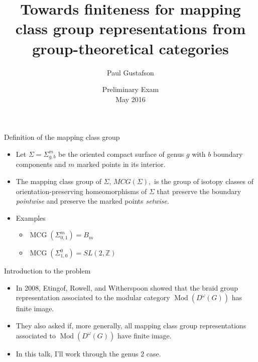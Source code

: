 \documentclass{beamer}
\title{Towards finiteness for mapping class group representations from group-theoretical categories}
\author{Paul Gustafson}%
\date{Preliminary Exam \\
May 2016}
\DeclareMathOperator{\MCG}{MCG}
\DeclareMathOperator{\Mod}{Mod}
\begin{document}
\begin{frame}
  \titlepage
\end{frame}



\begin{frame}{Definition of the mapping class group}
\begin{itemize}
\item
    Let $\Sigma = \Sigma_{g,b}^m$ be the oriented compact surface of genus $g$ with $b$ boundary components and $m$ marked points in its interior.

    \pause
\item
   The mapping class group of $\Sigma$, 
   $MCG(\Sigma),$
   is the group of isotopy classes of orientation-preserving homeomorphisms of $\Sigma$ that preserve the boundary \emph{pointwise} and preserve the marked points \emph{setwise}.
  
  \pause
  \item Examples
  \begin{itemize}
    \item $\MCG(\Sigma_{0,1}^m) = B_m$
    \item $\MCG(\Sigma_{1,0}^0) = SL(2,\mathbb Z)$
  \end{itemize}
\end{itemize}
\end{frame}

\begin{frame}{Introduction to the problem}

\begin{itemize}

\item In 2008, Etingof, Rowell, and Witherspoon \cite{erw} showed that the braid group representation associated to 
the modular category $\Mod(D^\omega(G))$ has finite image.

\pause \item They also asked if, more generally, all mapping class group representations associated to $\Mod(D^\omega(G))$ have 
finite image.

\pause \item In this talk, I'll work through the genus 2 case.
\end{itemize}
\end{frame}
\end{document}
